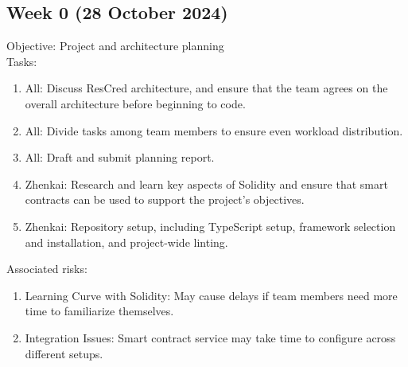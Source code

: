 \subsection{Week 0 (28 October 2024)}
Objective: Project and architecture planning \\
Tasks: 
\begin{enumerate}
    \item All: Discuss ResCred architecture, and ensure that the team agrees on the overall architecture before beginning to code.
    \item All: Divide tasks among team members to ensure even workload distribution.
    \item All: Draft and submit planning report.
    \item Zhenkai: Research and learn key aspects of Solidity and ensure that smart contracts can be used to support the project’s objectives.
    \item Zhenkai: Repository setup, including TypeScript setup, framework selection and installation, and project-wide linting.
\end{enumerate}
Associated risks:
\begin{enumerate}
    \item Learning Curve with Solidity: May cause delays if team members need more time to familiarize themselves.
    \item Integration Issues: Smart contract service may take time to configure across different setups.
\end{enumerate}
